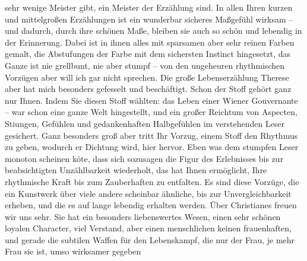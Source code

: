 \begin{ledgroupsized}[t]{13cm}
               sehr wenige Meister gibt, ein Meister der Erzählung sind. In allen Ihren kurzen und
               mittelgroßen Erzählungen ist ein wunderbar sicheres Maßgefühl wirksam – und dadurch,
               durch ihre schönen Maße, bleiben sie auch so schön und lebendig in der Erinnerung.
                  {\pb}Dabei ist in ihnen alles mit
               sparsamen aber sehr reinen Farben gemalt, die Abstufungen der Farbe mit dem
               sichersten Instinct hingesetzt, das Ganze ist nie grellbunt, nie aber stumpf – von
               den ungeheuren rhythmischen Vorzügen aber will ich gar nicht sprechen. Die große
               Lebenserzählung Therese aber hat mich besonders
               gefesselt und beschäftigt. Schon der Stoff gehört ganz nur Ihnen. Indem Sie diesen
               Stoff wählten: das Leben einer Wiener Gouvernante
               – war schon eine ganze Welt hingestellt, und ein großer Reichtum von Aspecten, Sti{\geminationm}ungen, Gefühlen und gedankenhaften Halbgefühlen im
               verstehenden Leser gesichert. Ganz besonders groß aber tritt Ihr Vorzug, einem Stoff
               den Rhythmus zu geben, wodurch er Dichtung wird, hier hervor. Eben was dem stumpfen
               Leser monoton scheinen kö{\geminationn}te, dass sich sozusagen die
               Figur des Erlebnisses bis zur beabsichtigten Unzählbarkeit wiederholt, das hat Ihnen
               ermöglicht, Ihre rhythmische Kraft bis zum Zauberhaften zu entfalten. Es sind diese
               Vorzüge, die ein Kunstwerk über viele andere scheinbar ähnliche, bis zur
               Unvergleichbarkeit erheben, und die {\pb}es auf lange lebendig erhalten
               werden.\pend
           \pstart
           Über Christianes\label{K_L02503-3v}\label{K_L02503-3h} freuen wir uns sehr. Sie
               hat ein besonders liebenswertes Wesen, einen sehr schönen loyalen Character, viel
               Verstand, aber einen menschlichen keinen frauenhaften, und gerade die subtilen Waffen
               für den Lebenskampf, die nur der Frau, je mehr Frau sie ist, umso wirksamer gegeben

\end{ledgroupsized}
